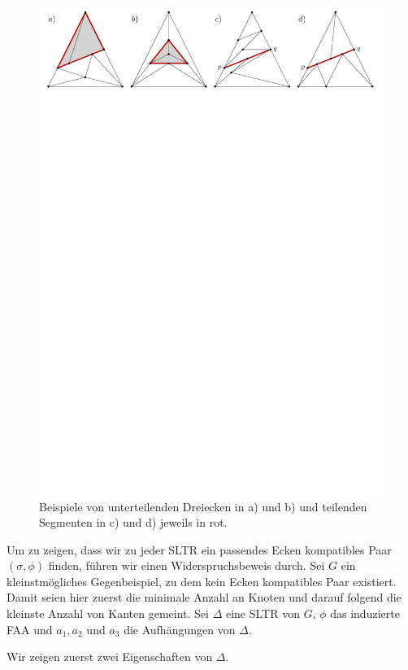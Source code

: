 \begin{figure}[h]
	\centering
	  \includegraphics[width=1\textwidth]{subdividing_ex.pdf}
    	\caption{Beispiele von unterteilenden Dreiecken in a) und b) und teilenden Segmenten in c) und d) jeweils in rot.}
    	\label{subdividing_ex}
\end{figure}

Um zu zeigen, dass wir zu jeder SLTR ein passendes Ecken kompatibles Paar $(\sigma,\phi)$ finden, führen wir einen Widerspruchsbeweis durch. Sei $G$ ein kleinstmögliches Gegenbeispiel, zu dem kein Ecken kompatibles Paar existiert. Damit seien hier zuerst die minimale Anzahl an Knoten und darauf folgend die kleinste Anzahl von Kanten gemeint. Sei $\Delta$ eine SLTR von $G$, $\phi$ das induzierte FAA und $a_1,a_2$ und $a_3$ die Aufhängungen von $\Delta$.

Wir zeigen zuerst zwei Eigenschaften von $\Delta$.

